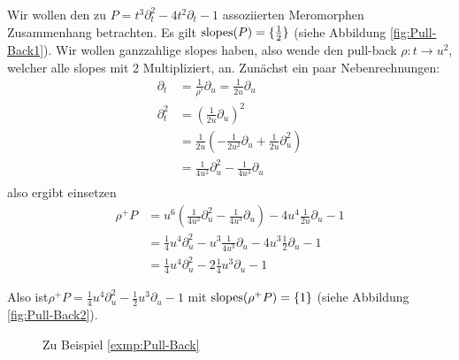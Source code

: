 \begin{exmp}
  Wir wollen den zu $P= t^3\partial_t^2-4t^2\partial_t-1$ assoziierten
  Meromorphen Zusammenhang
  betrachten.
    Es gilt $ \operatorname{slopes}(P)=\{\frac{1}{2}\} $ (siehe Abbildung
    \ref{fig:Pull-Back1}).
  Wir wollen ganzzahlige slopes haben, also wende den pull-back
  $\rho:t\rightarrow u^2$, welcher alle slopes mit 2 Multipliziert,
  an.
  Zunächst ein paar Nebenrechnungen:
  \begin{align*}
    \partial_t   &= \frac{1}{\rho'}\partial_u=\frac{1}{2u}\partial_u \\
    \partial_t^2 &= (\frac{1}{2u}\partial_u)^2\\
                 &= \frac{1}{2u}(-\frac{1}{2u^2}\partial_u +
                   \frac{1}{2u}\partial_u^2) \\
                 &= \frac{1}{4u^2}\partial_u^2-\frac{1}{4u^3}\partial_u \\
  \end{align*}
  also ergibt einsetzen
  \begin{align*}
    \rho^+P &= u^6(\frac{1}{4u^2}\partial_u^2-\frac{1}{4u^3}\partial_u)-
              4u^{4}\frac{1}{2u}\partial_u-1\\
            &= \frac{1}{4}u^4\partial_u^2-u^3\frac{1}{4u^3}\partial_u-
              4u^{3}\frac{1}{2}\partial_u-1\\
            &= \frac{1}{4}u^4\partial_u^2 -2\frac{1}{4}u^3\partial_u-1
  \end{align*}

  Also ist$\rho^+P= \frac{1}{4}u^4\partial_u^2 -\frac{1}{2}u^3\partial_u-1$ mit
  $ \operatorname{slopes}(\rho^+P)=\{1\} $ (siehe Abbildung \ref{fig:Pull-Back2}).
  \begin{figure}[h]
    \label{fig:Pull-Back}
    \caption{Zu Beispiel \ref{exmp:Pull-Back}}
    \begin{center}
\end{center}
\end{figure}
\end{exmp}

